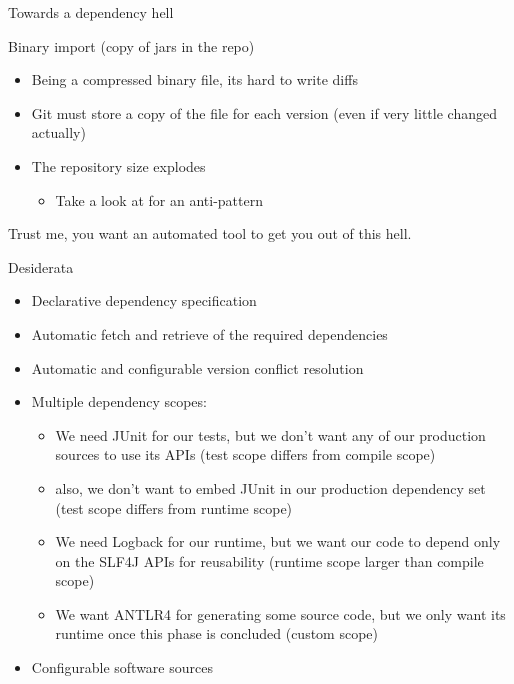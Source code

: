 \documentclass[presentation]{beamer}
\begin{document}
\begin{frame}{Towards a dependency hell}
\begin{block}{Binary import (copy of jars in the repo)}
\begin{itemize}
			\item Being a compressed binary file, its hard to write diffs
			\item Git must store a copy of the file for each version (even if very little changed actually)
			\item The repository size explodes
			\begin{itemize}
				\item Take a look at \cite{explodedrepository} for an anti-pattern
			\end{itemize}
		\end{itemize}
	\end{block}
	\begin{block}{}
		Trust me, you want an automated tool to get you out of this hell.
	\end{block}
\end{frame}

\begin{frame}[fragile]{Desiderata}
	\begin{itemize}
		\item Declarative dependency specification
		\item Automatic fetch and retrieve of the required dependencies
		\item Automatic and configurable version conflict resolution
		\item Multiple dependency scopes:
		\begin{itemize}
			\item We need JUnit for our tests, but we don't want any of our production sources to use its APIs (test scope differs from compile scope)
			\item also, we don't want to embed JUnit in our production dependency set (test scope differs from runtime scope)
			\item We need Logback \cite{logback} for our runtime, but we want our code to depend only on the SLF4J APIs for reusability (runtime scope larger than compile scope)
			\item We want ANTLR4 \cite{antlr4} for generating some source code, but we only want its runtime once this phase is concluded (custom scope)
		\end{itemize}
		\item Configurable software sources
	\end{itemize}
\end{frame}
\end{document}
